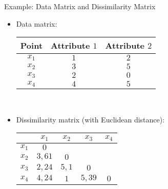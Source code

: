 \begin{frame}{Example: Data Matrix and Dissimilarity Matrix}
	\begin{itemize}
		\item Data matrix: \\[0.1cm]
		      \begin{center}
			      \begin{tabular}{| c | c | c |}
				      \hline
				      Point & Attribute $1$ & Attribute $2$ \\\hline
				      $x_1$ & $1$           & $2$           \\\hline
				      $x_2$ & $3$           & $5$           \\\hline
				      $x_3$ & $2$           & $0$           \\\hline
				      $x_4$ & $4$           & $5$           \\\hline
			      \end{tabular}\\[0.5cm]
		      \end{center}
		\item Dissimilarity matrix (with Euclidean distance): \\[0.1cm]
		      \begin{center}
			      \begin{tabular}{| c | c | c | c | c |}
				      \hline
				            & $x_1$  & $x_2$ & $x_3$  & $x_4$ \\\hline
				      $x_1$ & $0$    &       &        &       \\\hline
				      $x_2$ & $3,61$ & $0$   &        &       \\\hline
				      $x_3$ & $2,24$ & $5,1$ & $0$    &       \\\hline
				      $x_4$ & $4,24$ & $1$   & $5,39$ & $0$   \\\hline
			      \end{tabular}\\[0.2cm]
		      \end{center}
	\end{itemize}
\end{frame}

